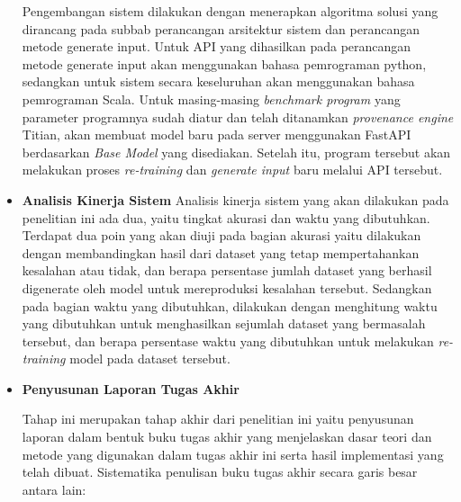 \begin{itemize}[topsep=0pt]
  Pengembangan sistem dilakukan dengan menerapkan algoritma
  solusi yang dirancang pada subbab perancangan arsitektur
  sistem dan perancangan metode generate input. Untuk API
  yang dihasilkan pada perancangan metode generate input
  akan menggunakan bahasa pemrograman python, sedangkan
  untuk sistem secara keseluruhan akan menggunakan bahasa
  pemrograman Scala. Untuk masing-masing \emph{benchmark program}
  yang parameter programnya sudah diatur dan telah ditanamkan
  \emph{provenance engine} Titian, akan membuat model baru 
  pada server menggunakan FastAPI berdasarkan \emph{Base Model} 
  yang disediakan. Setelah itu, program tersebut akan melakukan 
  proses \emph{re-training} dan \emph{generate input} baru melalui 
  API tersebut.

  \item \textbf{Analisis Kinerja Sistem}
  Analisis kinerja sistem yang akan dilakukan pada penelitian 
  ini ada dua, yaitu tingkat akurasi dan waktu yang dibutuhkan. 
  Terdapat dua poin yang akan diuji pada bagian akurasi yaitu 
  dilakukan dengan membandingkan hasil dari dataset yang tetap 
  mempertahankan kesalahan atau tidak, dan berapa persentase
  jumlah dataset yang berhasil digenerate oleh model untuk
  mereproduksi kesalahan tersebut. Sedangkan pada bagian waktu
  yang dibutuhkan, dilakukan dengan menghitung waktu yang
  dibutuhkan untuk menghasilkan sejumlah dataset yang bermasalah 
  tersebut, dan berapa persentase waktu yang dibutuhkan untuk
  melakukan \emph{re-training} model pada dataset tersebut.

  \item \textbf{Penyusunan Laporan Tugas Akhir}
  
  Tahap ini merupakan tahap akhir dari penelitian ini yaitu penyusunan laporan dalam bentuk buku tugas akhir yang menjelaskan dasar teori dan metode yang digunakan dalam tugas akhir ini serta hasil implementasi yang telah dibuat. Sistematika penulisan buku tugas akhir secara garis besar antara lain:


\end{itemize}
